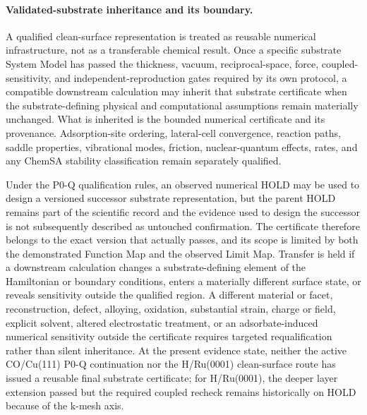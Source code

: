 
\paragraph{Validated-substrate inheritance and its boundary.}
A qualified clean-surface representation is treated as reusable numerical infrastructure, not as a transferable chemical result. Once a specific substrate System Model has passed the thickness, vacuum, reciprocal-space, force, coupled-sensitivity, and independent-reproduction gates required by its own protocol, a compatible downstream calculation may inherit that substrate certificate when the substrate-defining physical and computational assumptions remain materially unchanged. What is inherited is the bounded numerical certificate and its provenance. Adsorption-site ordering, lateral-cell convergence, reaction paths, saddle properties, vibrational modes, friction, nuclear-quantum effects, rates, and any ChemSA stability classification remain separately qualified.

Under the P0-Q qualification rules, an observed numerical HOLD may be used to design a versioned successor substrate representation, but the parent HOLD remains part of the scientific record and the evidence used to design the successor is not subsequently described as untouched confirmation. The certificate therefore belongs to the exact version that actually passes, and its scope is limited by both the demonstrated Function Map and the observed Limit Map. Transfer is held if a downstream calculation changes a substrate-defining element of the Hamiltonian or boundary conditions, enters a materially different surface state, or reveals sensitivity outside the qualified region. A different material or facet, reconstruction, defect, alloying, oxidation, substantial strain, charge or field, explicit solvent, altered electrostatic treatment, or an adsorbate-induced numerical sensitivity outside the certificate requires targeted requalification rather than silent inheritance. At the present evidence state, neither the active CO/Cu(111) P0-Q continuation nor the H/Ru(0001) clean-surface route has issued a reusable final substrate certificate; for H/Ru(0001), the deeper layer extension passed but the required coupled recheck remains historically on HOLD because of the k-mesh axis.
